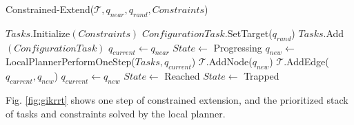 \documentclass{article}
\begin{document}
\begin{algorithm}[h]
  \caption{Constrained-Extend($\mathcal{T},q_{near},q_{rand},Constraints$)}
  \label{alg:constrained}
  \begin{algorithmic}
    \STATE $Tasks.$Initialize$(Constraints)$
    \STATE $ConfigurationTask$.SetTarget($q_{rand}$)
    \STATE $Tasks.$Add$(ConfigurationTask)$
    \STATE $q_{current} \leftarrow q_{near}$
    \STATE $State \leftarrow$ Progressing
    \STATE $q_{new} \leftarrow $ LocalPlannerPerformOneStep($Tasks,q_{current}$)
    \STATE $\mathcal{T}$.AddNode($q_{new}$)
    \STATE $\mathcal{T}$.AddEdge($q_{current},q_{new}$)
    \STATE $q_{current} \leftarrow q_{new}$
    \STATE $State \leftarrow$ Reached
    \ENDIF
    \ELSE 
    \STATE $State \leftarrow$ Trapped
    \ENDIF
    \ENDWHILE

  \end{algorithmic}
\end{algorithm}



Fig. \ref{fig:gikrrt} shows one step of constrained
extension, and the prioritized stack of tasks and constraints solved by the local planner.
\end{document}
